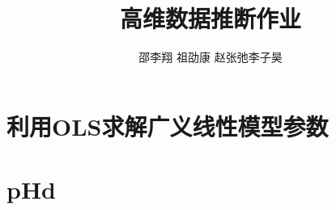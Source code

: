 \documentclass[cn,11pt]{elegantpaper}
\title{高维数据推断作业}
\author{邵李翔 \quad 祖劭康 \quad 赵张弛\quad 李子昊}
\date{}
\begin{document}
    


\maketitle
\newpage
\tableofcontents

\newpage
\section{利用OLS求解广义线性模型参数}



\section{pHd}

% 

% 
\end{document}
